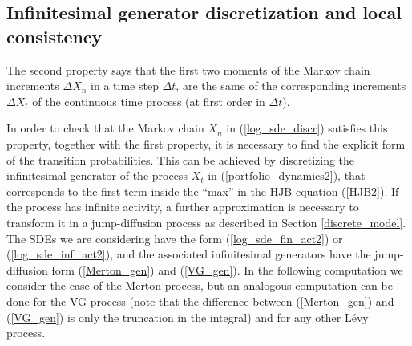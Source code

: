 \subsection{Infinitesimal generator discretization and local consistency}\label{B2}

The second property says that the first two moments of the Markov chain increments $\Delta X_n$ in a time step $\Delta t$, 
are the same of the corresponding increments $\Delta X_t$ of the continuous time process (at first order in $\Delta t$).

In order to check that the Markov chain $X_n$ in (\ref{log_sde_discr}) satisfies this property, 
together with the first property, it is necessary to find the explicit form of the 
transition probabilities. This can be achieved by discretizing the infinitesimal generator of the process $X_t$ in (\ref{portfolio_dynamics2}),
that corresponds to the first term inside the ``max'' in the HJB equation (\ref{HJB2}).
If the process has infinite activity, a further approximation is necessary to transform it in a jump-diffusion process as described in Section \ref{discrete_model}. 
The SDEs we are considering have the form (\ref{log_sde_fin_act2}) or (\ref{log_sde_inf_act2}), 
and the associated infinitesimal generators have the jump-diffusion form (\ref{Merton_gen}) and (\ref{VG_gen}).
In the following computation we consider the case of the Merton process, but an analogous computation can be done for the VG process 
(note that the difference between (\ref{Merton_gen}) and (\ref{VG_gen}) is only the truncation in the integral) and for any other L\'{e}vy process.


